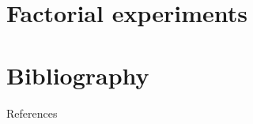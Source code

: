 \documentclass[
  ignorenonframetext,
  aspectratio=169]{beamer}
\begin{document}
\hypertarget{factorial-experiments}{%
\section{Factorial experiments}\label{factorial-experiments}}

\begin{frame}{}
\protect\hypertarget{section-14}{}
\end{frame}

\hypertarget{bibliography}{%
\section{Bibliography}\label{bibliography}}

\begin{frame}{References}
\protect\hypertarget{references}{}
\end{frame}
\end{document}
